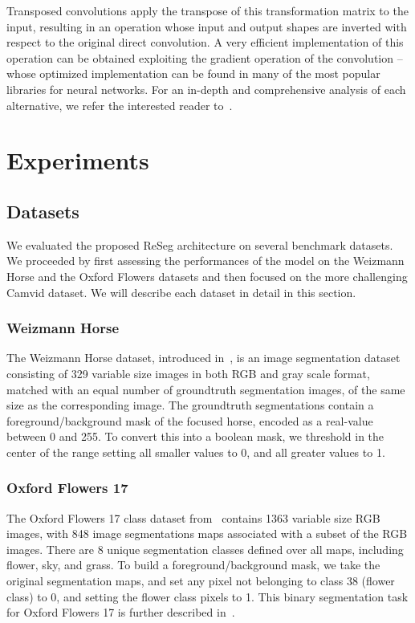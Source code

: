 \documentclass[times,art10,twocolumn,latex8]{article}
\begin{document}
Transposed convolutions apply the transpose of this transformation matrix to
the input, resulting in an operation whose input and output shapes are inverted
with respect to the original direct convolution. A very efficient implementation of
this operation can be obtained exploiting the gradient operation of the
convolution -- whose optimized implementation can be found in many of the most
popular libraries for neural networks. For an in-depth and comprehensive
analysis of each alternative, we refer the interested reader
to~\cite{dumoulin2016guide}.

\section{Experiments}\label{sec:Experiments}

\subsection{Datasets}
We evaluated the proposed ReSeg architecture on several benchmark datasets.
We proceeded by first assessing the performances of the model on the Weizmann
Horse and the Oxford Flowers datasets and then focused on the more challenging
Camvid dataset. We will describe each dataset in detail in this section.

\subsubsection{Weizmann Horse}
The Weizmann Horse dataset, introduced in~\cite{Borenstein04combiningtop-down},
is an image
segmentation dataset consisting of 329 variable size images in both RGB and
gray scale
format, matched with an equal number of groundtruth segmentation images, of
the same size as the corresponding image.
The groundtruth segmentations contain a foreground/background mask of the
focused horse, encoded as a real-value between 0 and 255. To convert this into
a boolean mask, we threshold in the center of the range setting all smaller
values to 0, and all greater values to 1.




\subsubsection{Oxford Flowers 17}
The Oxford Flowers 17 class dataset from~\cite{Nilsback06} contains 1363
variable size RGB images, with 848 image segmentations maps associated with
a subset of
the RGB images. There are 8 unique segmentation classes defined over all maps,
including flower, sky, and grass. To build a foreground/background mask,
we take the original segmentation maps, and set any pixel not belonging to
class 38 (flower class) to 0, and setting the flower class pixels to 1.
This binary segmentation task for Oxford Flowers 17 is further described
in~\cite{Xiaomeng14}.
\end{document}
